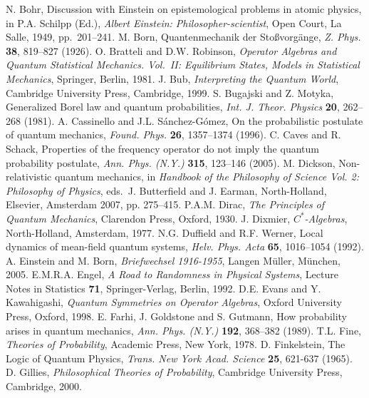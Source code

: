 \documentclass[12pt]{article}
\begin{document}
\begin{small}
\raggedright
 \begin{thebibliography}{99}
 N. Bohr,  Discussion with Einstein on epistemological problems in atomic physics, in P.A. Schilpp (Ed.), {\it Albert Einstein: Philosopher-scientist},  
Open Court, La Salle, 1949, pp.\ 201--241.
 M. Born, Quantenmechanik der Sto\ss vorg\"{a}nge, {\it Z. Phys.} {\bf 38}, 819--827 (1926).
 O. Bratteli  and D.W.  Robinson, {\it
Operator Algebras and Quantum Statistical Mechanics. Vol.\ II:
Equilibrium States, Models in Statistical Mechanics},  Springer, Berlin,  1981.
 J. Bub, {\it Interpreting the Quantum World}, Cambridge University Press, Cambridge, 1999.
  S. Bugajski and Z.  Motyka, Generalized Borel law and quantum probabilities,
{\it Int. J. Theor. Physics} {\bf 20}, 262--268 (1981).
 A. Cassinello and J.L. S\'{a}nchez-G\'{o}mez, On the probabilistic postulate of quantum mechanics, {\it  Found. Phys.} {\bf 26}, 1357--1374 (1996).
 C. Caves and R. Schack, Properties of the frequency operator do not imply the quantum probability postulate, {\it  Ann. Phys. (N.Y.)} {\bf 315}, 123--146 (2005). 
 M. Dickson, Non-relativistic quantum mechanics, in
{\it Handbook of the Philosophy of Science Vol. 2: Philosophy of Physics}, eds.\ J. Butterfield and J. Earman, North-Holland, Elsevier, Amsterdam 2007,  pp. 275--415.
 P.A.M. Dirac,   {\it The Principles of Quantum
Mechanics}, Clarendon Press, Oxford, 1930.
 J. Dixmier, {\it
$C^*$-Algebras},  North-Holland, Amsterdam, 1977. 
 N.G. Duffield  and R.F. Werner,  Local dynamics of mean-field quantum systems, {\it Helv. Phys.  Acta} {\bf 65}, 1016--1054 (1992). 
 A. Einstein and M. Born, {\it Briefwechsel 1916-1955}, 
Langen M\"{u}ller, M\"{u}nchen, 2005. 
 E.M.R.A.
Engel, {\it A Road to Randomness in Physical Systems}, Lecture Notes in Statistics {\bf 71}, Springer-Verlag, Berlin, 1992.
 D.E. Evans and Y. Kawahigashi, {\it Quantum Symmetries on Operator Algebras},
Oxford University Press, Oxford, 1998.
 E. Farhi, J. Goldstone and S. Gutmann, How probability arises in quantum mechanics,  {\it Ann. Phys. (N.Y.)} {\bf 192}, 368--382 (1989). 
 T.L. Fine,  {\it Theories of Probability}, Academic Press, New York, 1978.
 D. Finkelstein, The Logic of Quantum Physics, {\it  Trans. New York Acad. Science} {\bf 25}, 621-637 (1965). 
 D. Gillies, {\it Philosophical Theories of Probability}, Cambridge University Press,  Cambridge,  2000.

\end{thebibliography}
\end{small}
\end{document}
